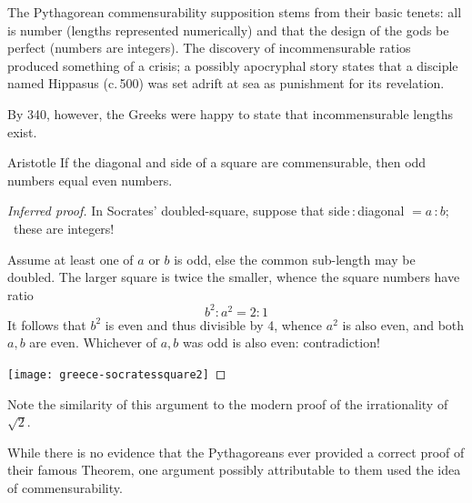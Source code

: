 The Pythagorean commensurability supposition stems from their basic tenets: all is number (lengths represented numerically) and that the design of the gods be perfect (numbers are integers). The discovery of incommensurable ratios produced something of a crisis; a possibly apocryphal story states that a disciple named Hippasus (c.\,500\BC) was set adrift at sea as punishment for its revelation.\smallbreak %

By 340\BC, however, the Greeks were happy to state that incommensurable lengths exist.

\begin{thm*}{Aristotle}
	If the diagonal and side of a square are commensurable, then odd numbers equal even numbers.
\end{thm*}

\begin{proof}[Inferred proof]
	In Socrates' doubled-square, suppose that side\,:\,diagonal $=a$\,:\,$b$; \ these are integers!\par
	\begin{minipage}[t]{0.8\linewidth}\vspace{-5pt}
		Assume at least one of $a$ or $b$ is odd, else the common sub-length may be doubled. The larger square is twice the smaller, whence the square numbers have ratio
		\[
			b^2:a^2=2:1
		\]
		It follows that $b^2$ is even and thus divisible by 4, whence $a^2$ is also even, and both $a,b$ are even. Whichever of $a,b$ was odd is also even: contradiction!
	\end{minipage}
	\hfill
	\begin{minipage}[t]{0.18\linewidth}\vspace{-8pt}
		\flushright
		\texttt{[image: greece-socratessquare2]}
	\end{minipage}
\end{proof}
Note the similarity of this argument to the modern proof of the irrationality of $\sqrt 2$.\goodbreak

While there is no evidence that the Pythagoreans ever provided a correct proof of their famous Theorem, one argument possibly attributable to them used the idea of commensurability.

